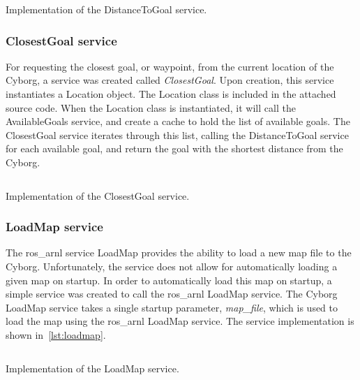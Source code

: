 \documentclass[\rootfolder/main.tex]{subfiles}
\begin{document}
\begin{listing}
    \inputminted[fontsize=\scriptsize]{python}{\rootfolder/Chapters/Chapter6/Listings/distance_to_goal.py}
    \caption{Implementation of the DistanceToGoal service.}
    \label{lst:distancetogoal}
\end{listing}

\subsubsection{ClosestGoal service}

For requesting the closest goal, or waypoint, from the current location of the Cyborg, a service was created called \emph{ClosestGoal}.
Upon creation, this service instantiates a Location object.
The Location class is included in the attached source code.
When the Location class is instantiated, it will call the AvailableGoals service, and create a cache to hold the list of available goals.
The ClosestGoal service iterates through this list, calling the DistanceToGoal service for each available goal, and return the goal with the shortest distance from the Cyborg.

\begin{listing}
    \inputminted[fontsize=\scriptsize]{python}{\rootfolder/Chapters/Chapter6/Listings/closest_goal.py}
    \caption{Implementation of the ClosestGoal service.}
    \label{lst:closestgoal}
\end{listing}

\subsubsection{LoadMap service}

The ros\_arnl service LoadMap provides the ability to load a new map file to the Cyborg.
Unfortunately, the service does not allow for automatically loading a given map on startup.
In order to automatically load this map on startup, a simple service was created to call the ros\_arnl LoadMap service.
The Cyborg LoadMap service takes a single startup parameter, \emph{map\_file}, which is used to load the map using the ros\_arnl LoadMap service.
The service implementation is shown in~\cref{lst:loadmap}.

\begin{listing}
    \inputminted[fontsize=\scriptsize]{python}{\rootfolder/Chapters/Chapter6/Listings/load_map.py}
    \caption{Implementation of the LoadMap service.}
    \label{lst:loadmap}
\end{listing}
\end{document}
